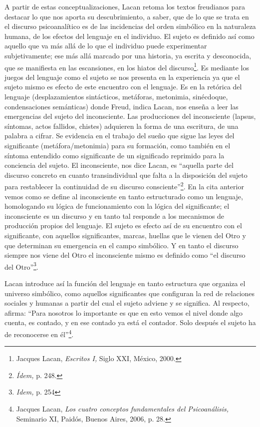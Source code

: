 A partir de estas conceptualizaciones, Lacan retoma los textos freudianos para destacar lo que nos aporta su descubrimiento, a saber, que de lo que se trata en el discurso psicoanalítico es de las incidencias del orden simbólico en la naturaleza humana, de los efectos del lenguaje en el individuo. El sujeto es definido así como aquello que va más allá de lo que el individuo puede experimentar subjetivamente; ese más allá marcado por una historia, ya escrita y desconocida, que se manifiesta en las escansiones, en los hiatos del discurso\footnote{Jacques Lacan, \emph{Escritos I,} Siglo XXI, México, 2000.}. Es mediante los juegos del lenguaje como el sujeto se nos presenta en la experiencia ya que el sujeto mismo es efecto de este encuentro con el lenguaje. Es en la retórica del lenguaje (desplazamientos sintácticos, metáforas, metonimia, sinécdoque, condensaciones semánticas) donde Freud, indica Lacan, nos enseña a leer las emergencias del sujeto del inconsciente. Las producciones del inconsciente (lapsus, síntomas, actos fallidos, chistes) adquieren la forma de una escritura, de una palabra a cifrar. Se evidencia en el trabajo del sueño que sigue las leyes del significante (metáfora/metonimia) para su formación, como también en el síntoma entendido como significante de un significado reprimido para la conciencia del sujeto. El inconsciente, nos dice Lacan, es \enquote{aquella parte del discurso concreto en cuanto transindividual que falta a la disposición del sujeto para restablecer la continuidad de su discurso consciente}\footnote{\emph{Ídem,} p. 248.}. En la cita anterior vemos como se define al inconsciente en tanto estructurado como un lenguaje, homologando su lógica de funcionamiento con la lógica del significante; el inconsciente es un discurso y en tanto tal responde a los mecanismos de producción propios del lenguaje. El sujeto es efecto así de su encuentro con el significante, con aquellos significantes, marcas, huellas que le vienen del Otro y que determinan su emergencia en el campo simbólico. Y en tanto el discurso siempre nos viene del Otro el inconsciente mismo es definido como \enquote{el discurso del Otro}\footnote{\emph{Idem,} p. 254}.

Lacan introduce así la función del lenguaje en tanto estructura que organiza el universo simbólico, como aquellos significantes que configuran la red de relaciones sociales y humanas a partir del cual el sujeto adviene y se significa. Al respecto, afirma: \enquote{Para nosotros lo importante es que en esto vemos el nivel donde  algo cuenta, es contado, y en ese contado ya está el contador. Solo después el sujeto ha de reconocerse en él}\footnote{Jacques Lacan, \emph{Los cuatro conceptos fundamentales del Psicoanálisis,} Seminario XI, Paidós, Buenos Aires, 2006, p. 28.}.

